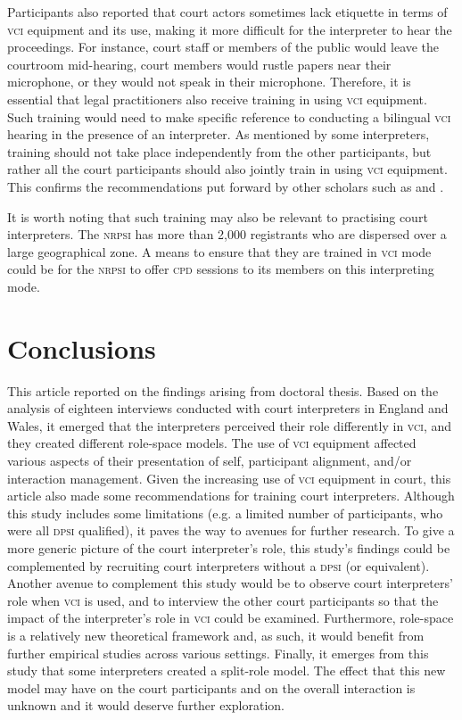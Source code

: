 \documentclass[output=paper]{langsci/langscibook}
\begin{document}
Participants also reported that court actors sometimes lack etiquette in terms of \textsc{vci} equipment and its use, making it more difficult for the interpreter to hear the proceedings. For instance, court staff or members of the public would leave the courtroom mid-hearing, court members would rustle papers near their microphone, or they would not speak in their microphone. Therefore, it is essential that legal practitioners also receive training in using \textsc{vci} equipment. Such training would need to make specific reference to conducting a bilingual \textsc{vci} hearing in the presence of an interpreter. As mentioned by some interpreters, training should not take place independently from the other participants, but rather all the court participants should also jointly train in using \textsc{vci} equipment. This confirms the recommendations put forward by other scholars such as \citet{Braun2011a} and \citet{Fowler2012}. 

It is worth noting that such training may also be relevant to practising court interpreters. The \textsc{nrpsi} has more than 2,000 registrants who are dispersed over a large geographical zone. A means to ensure that they are trained in \textsc{vci} mode could be for the \textsc{nrpsi} to offer \textsc{cpd} sessions to its members on this interpreting mode. 

\section{Conclusions}
\label{sec:devaux:7}
This article reported on the findings arising from  doctoral thesis. Based on the analysis of eighteen interviews conducted with court interpreters in England and Wales, it emerged that the interpreters perceived their role differently in \textsc{vci}, and they created different role-space models. The use of \textsc{vci} equipment affected various aspects of their presentation of self, participant alignment, and/or interaction management. Given the increasing use of \textsc{vci} equipment in court, this article also made some recommendations for training court interpreters. Although this study includes some limitations (e.g. a limited number of participants, who were all \textsc{dpsi} qualified), it paves the way to avenues for further research. To give a more generic picture of the court interpreter’s role, this study’s findings could be complemented by recruiting court interpreters without a \textsc{dpsi} (or equivalent). Another avenue to complement this study would be to observe court interpreters’ role when \textsc{vci} is used, and to interview the other court participants so that the impact of the interpreter’s role in \textsc{vci} could be examined. Furthermore, role-space is a relatively new theoretical framework and, as such, it would benefit from further empirical studies across various settings. Finally, it emerges from this study that some interpreters created a split-role model. The effect that this new model may have on the court participants and on the overall interaction is unknown and it would deserve further exploration. 

{\sloppy\printbibliography[heading=subbibliography,notkeyword=this]} 
\end{document}
